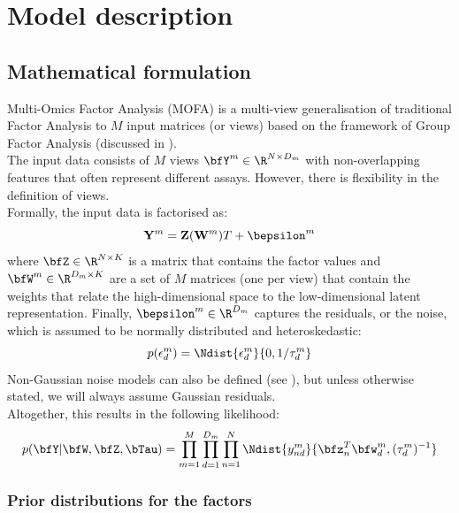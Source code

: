 \graphicspath{{Chapter2/Figs/}}

\section{Model description} \label{mofa:model_description}

\subsection{Mathematical formulation}

Multi-Omics Factor Analysis (MOFA) is a multi-view generalisation of traditional Factor Analysis to $M$ input matrices (or views) based on the framework of Group Factor Analysis (discussed in ).\\
The input data consists of $M$ views $\bfY^m \in \R^{N \times D_m}$ with non-overlapping features that often represent different assays. However, there is flexibility in the definition of views.\\
Formally, the input data is factorised as:
\begin{equation} \label{mofa_master_equation}
	\mathbf{Y}^m = \mathbf{Z}(\mathbf{W}^{m}){T} + \bepsilon^m
\end{equation}
where $\bfZ \in \R^{N \times K}$ is a matrix that contains the factor values and $\bfW^m \in \R^{D_m \times K}$ are a set of $M$ matrices (one per view) that contain the weights that relate the high-dimensional space to the low-dimensional latent representation. Finally, $\bepsilon^m \in \R^{D_m}$ captures the residuals, or the noise, which is assumed to be normally distributed and heteroskedastic:
\begin{equation}
	p(\epsilon^{m}_{d}) = \Ndist{\epsilon^{m}_{d}}{0,1/\tau_{d}^{m}}
\end{equation}
Non-Gaussian noise models can also be defined (see ), but unless otherwise stated, we will always assume Gaussian residuals.\\
Altogether, this results in the following likelihood:
\begin{equation}
	p(\bfY|\bfW,\bfZ,\bTau) = \prod_{m=1}^{M} \prod_{d=1}^{D_m} \prod_{n=1}^{N} \Ndist{y_{nd}^m}{\bfz_{n}^T\bfw_{d}^{m},(\tau_d^m)^{-1}}
\end{equation}

\subsubsection{Prior distributions for the factors}  \label{section:mofa_factors}

